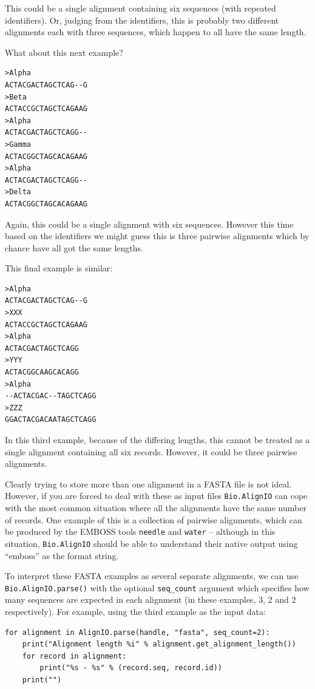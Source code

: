 \documentclass{report}
\begin{document}
\noindent This could be a single alignment containing six sequences (with repeated identifiers).  Or, judging from the identifiers, this is probably two different alignments each with three sequences, which happen to all have the same length.

What about this next example?

\begin{verbatim}
>Alpha
ACTACGACTAGCTCAG--G
>Beta
ACTACCGCTAGCTCAGAAG
>Alpha
ACTACGACTAGCTCAGG--
>Gamma
ACTACGGCTAGCACAGAAG
>Alpha
ACTACGACTAGCTCAGG--
>Delta
ACTACGGCTAGCACAGAAG
\end{verbatim}

\noindent Again, this could be a single alignment with six sequences.  However this time based on the identifiers we might guess this is three pairwise alignments which by chance have all got the same lengths.

This final example is similar:

\begin{verbatim}
>Alpha
ACTACGACTAGCTCAG--G
>XXX
ACTACCGCTAGCTCAGAAG
>Alpha
ACTACGACTAGCTCAGG
>YYY
ACTACGGCAAGCACAGG
>Alpha
--ACTACGAC--TAGCTCAGG
>ZZZ
GGACTACGACAATAGCTCAGG
\end{verbatim}

\noindent In this third example, because of the differing lengths, this cannot be treated as a single alignment containing all six records.  However, it could be three pairwise alignments.

Clearly trying to store more than one alignment in a FASTA file is not ideal.  However, if you are forced to deal with these as input files \verb|Bio.AlignIO| can cope with the most common situation where all the alignments have the same number of records.
One example of this is a collection of pairwise alignments, which can be produced by the EMBOSS tools \verb|needle| and \verb|water| -- although in this situation, \verb|Bio.AlignIO| should be able to understand their native output using ``emboss'' as the format string.

To interpret these FASTA examples as several separate alignments, we can use \verb|Bio.AlignIO.parse()| with the optional \verb|seq_count| argument which specifies how many sequences are expected in each alignment (in these examples, 3, 2 and 2 respectively).
For example, using the third example as the input data:

\begin{verbatim}
for alignment in AlignIO.parse(handle, "fasta", seq_count=2):
    print("Alignment length %i" % alignment.get_alignment_length())
    for record in alignment:
        print("%s - %s" % (record.seq, record.id))
    print("")
\end{verbatim}
\end{document}
